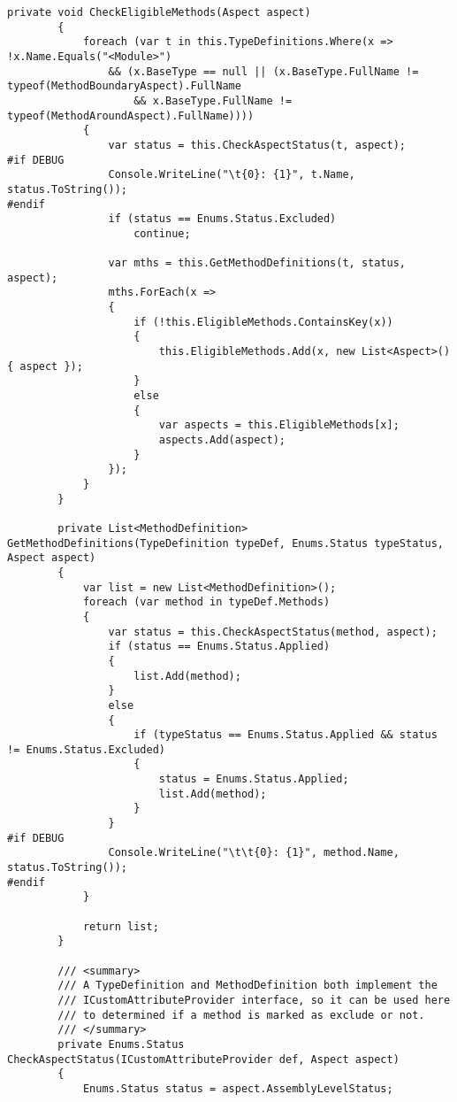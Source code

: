 \begin{lstlisting}[caption={../buffalo/Weaver.cs}, label=../buffalo/Weaver.cs, frame=tb, basicstyle=\scriptsize]
        private void CheckEligibleMethods(Aspect aspect)
        {
            foreach (var t in this.TypeDefinitions.Where(x => !x.Name.Equals("<Module>")
                && (x.BaseType == null || (x.BaseType.FullName != typeof(MethodBoundaryAspect).FullName
                    && x.BaseType.FullName != typeof(MethodAroundAspect).FullName))))
            {
                var status = this.CheckAspectStatus(t, aspect);
#if DEBUG
                Console.WriteLine("\t{0}: {1}", t.Name, status.ToString());
#endif
                if (status == Enums.Status.Excluded)
                    continue;

                var mths = this.GetMethodDefinitions(t, status, aspect);
                mths.ForEach(x =>
                {
                    if (!this.EligibleMethods.ContainsKey(x))
                    {
                        this.EligibleMethods.Add(x, new List<Aspect>() { aspect });
                    }
                    else
                    {
                        var aspects = this.EligibleMethods[x];
                        aspects.Add(aspect);
                    }
                });
            }
        }

        private List<MethodDefinition> GetMethodDefinitions(TypeDefinition typeDef, Enums.Status typeStatus, Aspect aspect)
        {
            var list = new List<MethodDefinition>();
            foreach (var method in typeDef.Methods)
            {
                var status = this.CheckAspectStatus(method, aspect);
                if (status == Enums.Status.Applied)
                {
                    list.Add(method);
                }
                else
                {
                    if (typeStatus == Enums.Status.Applied && status != Enums.Status.Excluded)
                    {
                        status = Enums.Status.Applied;
                        list.Add(method);
                    }
                }
#if DEBUG
                Console.WriteLine("\t\t{0}: {1}", method.Name, status.ToString());
#endif
            }

            return list;
        }

        /// <summary>
        /// A TypeDefinition and MethodDefinition both implement the
        /// ICustomAttributeProvider interface, so it can be used here
        /// to determined if a method is marked as exclude or not.
        /// </summary>
        private Enums.Status CheckAspectStatus(ICustomAttributeProvider def, Aspect aspect)
        {
            Enums.Status status = aspect.AssemblyLevelStatus;


\end{lstlisting}
